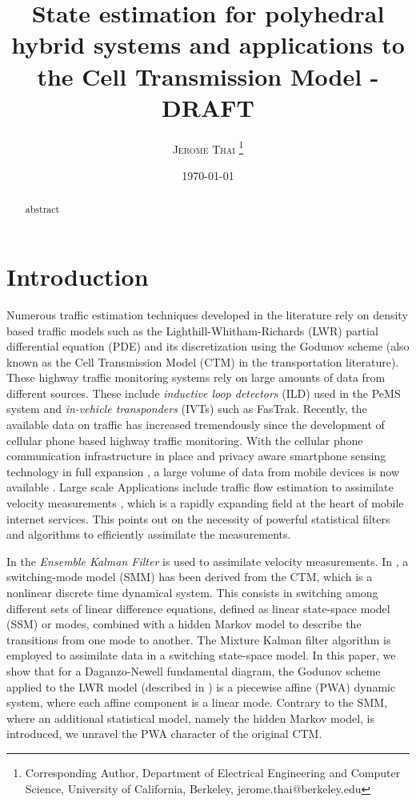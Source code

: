 \documentclass[11pt]{article}
\title{State estimation for polyhedral hybrid systems and applications to the Cell Transmission Model - DRAFT}
\date{\today}
\author{
        \textsc{Jerome Thai}
        \thanks{Corresponding Author, Department of Electrical Engineering and Computer Science, University of California, Berkeley, jerome.thai@berkeley.edu}
}
\numberwithin{equation}{section}
\numberwithin{figure}{section}
\numberwithin{table}{section}
\begin{document}
\maketitle

\begin{abstract}

abstract

\end{abstract}

\section{Introduction}

Numerous traffic estimation techniques developed in the literature rely on density based traffic models such as the Lighthill-Whitham-Richards (LWR) partial differential equation (PDE) \cite{Lighthill1955,Richards1956} and its discretization using the Godunov scheme \cite{Lebacque1996,LeVeque1992,Strub2006} (also known as the Cell Transmission Model (CTM) \cite{Daganzo1994,Daganzo1995} in the transportation literature). These highway traffic monitoring systems rely on large amounts of data from different sources. These include \textit{inductive loop detectors} (ILD) used in the PeMS system \cite{Chen2005} and \textit{in-vehicle transponders} (IVTs) such as FasTrak. Recently, the available data on traffic has increased tremendously since the development of cellular phone based highway traffic monitoring. With the cellular phone communication infrastructure in place and privacy aware smartphone sensing technology in full expansion \cite{Hoh2008}, a large volume of data from mobile devices is now available \cite{Herrera2009}. Large scale Applications include traffic flow estimation to assimilate velocity measurements \cite{Work2008,Work2008a}, which is a rapidly expanding field at the heart of mobile internet services. This points out on the necessity of powerful statistical filters and algorithms to efficiently assimilate the measurements.

In \cite{Work2008,Work2008a} the \textit{Ensemble Kalman Filter} is used to assimilate velocity measurements. In \cite{Munoz2003}, a switching-mode model (SMM) has been derived from the CTM, which is a nonlinear discrete time dynamical system. This consists in switching among different sets of linear difference equations, defined as linear state-space model (SSM) or modes, combined with a hidden Markov model to describe the transitions from one mode to another. The Mixture Kalman filter algorithm \cite{Chen2000} is employed to assimilate data in a switching state-space model. In this paper, we show that for a Daganzo-Newell fundamental diagram, the Godunov scheme applied to the LWR model (described in \cite{Daganzo1995}) is a piecewise affine (PWA) dynamic system, where each affine component is a linear mode. Contrary to the SMM, where an additional statistical model, namely the hidden Markov model, is introduced, we unravel the PWA character of the original CTM.
\end{document}
